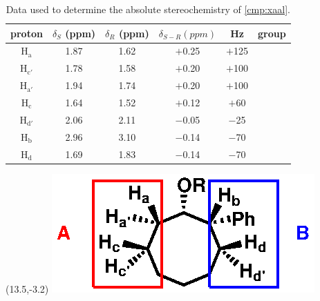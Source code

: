 \begin{table}[h]
{\small
\begin{tabular}{cccccc}
\toprule
proton & $\delta_S$ (ppm) & $\delta_R$ (ppm) & $\delta_{S-R} (ppm)$ & Hz & group \\
\midrule
H$_\mathrm{a}$ & 1.87 & 1.62 & $+$0.25 & $+$125 & \textbf{\color{red}{A}} \\
H$_\mathrm{c'}$ & 1.78 & 1.58 & $+$0.20 & $+$100 & \textbf{\color{red}{A}} \\
H$_\mathrm{a'}$ & 1.94 & 1.74 & $+$0.20 & $+$100 & \textbf{\color{red}{A}} \\
H$_\mathrm{c}$ & 1.64 & 1.52 & $+$0.12 & $+$60 & \textbf{\color{red}{A}} \\
H$_\mathrm{d'}$ & 2.06 & 2.11 & $-$0.05 & $-$25 & \textbf{\color{blue}{B}} \\
H$_\mathrm{b}$ & 2.96 & 3.10 & $-$0.14 & $-$70 & \textbf{\color{blue}{B}} \\
H$_\mathrm{d}$ & 1.69 & 1.83 & $-$0.14 & $-$70 & \textbf{\color{blue}{B}} \\
\bottomrule
\end{tabular}
}
 \begin{textblock}{1}(13.5,-3.2)  \includegraphics[scale=0.8]{chp_asymmetric/images/prooflabels}
 \end{textblock}
\caption{Data used to determine the absolute stereochemistry of \ref{cmp:xaal}.}
\label{tbl:asmandelatestereoproof}
\end{table}


